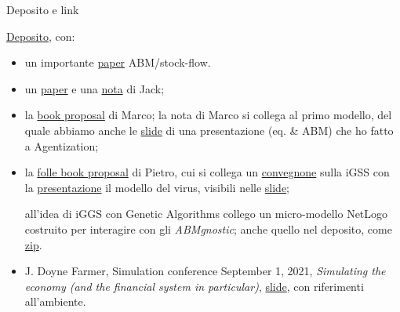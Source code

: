 \documentclass[]{beamer}
\begin{document}
\begin{frame}{Deposito e link}

\href{https://terna.to.it/ejmmp/deposito/}{Deposito}, con:

\begin{itemize}

\item
un importante \href{https://terna.to.it/ejmmp/deposito/stockFlow.pdf}{paper} ABM/stock-flow.

\item
un \href{https://terna.to.it/ejmmp/deposito/JackIonHayek'sEconomics.pdf}{paper} e una \href{https://terna.to.it/ejmmp/deposito/JackIIonHayek-NoteOnAtomicInvestmentProcesses.pdf}{nota} di Jack;

\item
la \href{https://terna.to.it/ejmmp/deposito/MarcoBookProposalTheoreticalModelBookProposal.pdf}{book proposal} di Marco; la nota di Marco si collega al primo modello, del quale abbiamo anche le \href{https://terna.to.it/oligopolyAgentization.pdf}{slide} di una presentazione (eq. \& ABM) che ho fatto a Agentization;

\item
la \href{https://terna.to.it/ejmmp/deposito/PietroBookProposal.pdf}{folle book proposal} di Pietro, cui si collega un \href{https://www.igss-workshop.org}{convegnone} sulla iGSS con la \href{https://www.youtube.com/watch?v=X7DLFvOhqVo}{presentazione} il modello del virus, visibili nelle \href{https://static1.squarespace.com/static/5e0a8466674f5b6963a2e949/t/60bff462ace45c3d0b9f04cf/1623192677563/terna-slides.pdf}{slide};

all'idea di iGGS con Genetic Algorithms collego un micro-modello NetLogo costruito per interagire con gli \emph{ABMgnostic}; \È anche quello nel deposito, come \href{https://terna.to.it/ejmmp/deposito/theRace.zip}{zip}.

\item
J. Doyne Farmer, Simulation conference September 1, 2021, \emph{Simulating the economy
(and the financial system in particular)}, \href{https://www.suomenpankki.fi/globalassets/en/financial-stability/payment-and-settelement-system-simulator/events/2021_01_farmer.pdf}{slide}, con riferimenti all'ambiente.


\end{itemize}

\end{frame}
\end{document}
